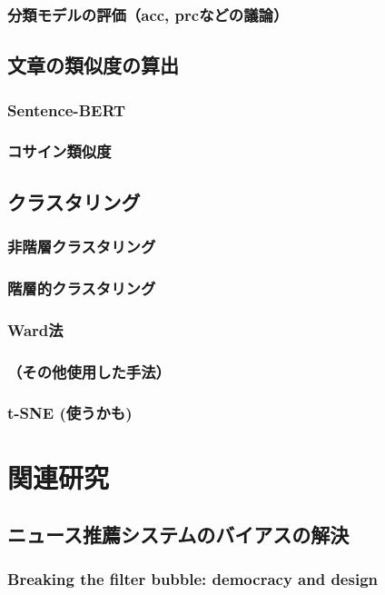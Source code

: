 \documentclass[12pt,a4j]{jreport}
\begin{document}
    \subsection{分類モデルの評価（acc, prcなどの議論）}
\section{文章の類似度の算出}
    \subsection{Sentence-BERT}
    \subsection{コサイン類似度}
\section{クラスタリング}
    \subsection{非階層クラスタリング}
    \subsection{階層的クラスタリング}
    \subsection{Ward法 }
    \subsection{（その他使用した手法）}
    \subsection{t-SNE (使うかも)}


\chapter{関連研究}

\section{ニュース推薦システムのバイアスの解決}
    \subsection{Breaking the filter bubble: democracy and design}
\end{document}
